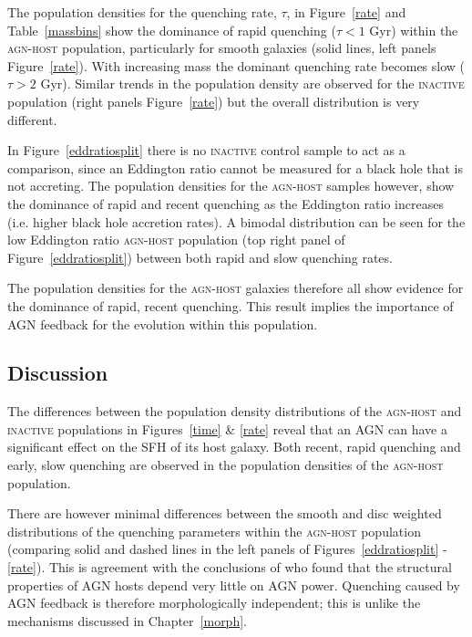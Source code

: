 The population densities for the quenching rate, $\tau$, in Figure~\ref{rate} and Table~\ref{massbins} show the dominance of rapid quenching ($\tau < 1$ Gyr) within the \textsc{agn-host} population, particularly for smooth galaxies (solid lines, left panels Figure~\ref{rate}). With increasing mass the dominant quenching rate becomes slow ($\tau > 2$ Gyr). Similar trends in the population density are observed for the \textsc{inactive} population (right panels Figure~\ref{rate}) but the overall distribution is very different. 

In Figure~\ref{eddratiosplit} there is no \textsc{inactive} control sample to act as a comparison, since an Eddington ratio cannot be measured for a black hole that is not accreting. The population densities for the \textsc{agn-host} samples however, show the dominance of rapid and recent quenching as the Eddington ratio increases (i.e. higher black hole accretion rates). A bimodal distribution can be seen for the low Eddington ratio \textsc{agn-host} population (top right panel of Figure~\ref{eddratiosplit}) between both rapid and slow quenching rates. 

The population densities for the \textsc{agn-host} galaxies therefore all show evidence for the dominance of rapid, recent quenching. This result implies the importance of AGN feedback for the evolution within this population.

\subsection{Discussion}\label{sec:agndis}

The differences between the population density distributions of the \textsc{agn-host} and \textsc{inactive} populations in Figures~\ref{time} \& \ref{rate} reveal that an AGN can have a significant effect on the SFH of its host galaxy. Both recent, rapid quenching and early, slow quenching are observed in the population densities of the \textsc{agn-host} population. 

There are however minimal differences between the smooth and disc weighted distributions of the quenching parameters within the \textsc{agn-host} population (comparing solid and dashed lines in the left panels of Figures~\ref{eddratiosplit} - \ref{rate}). This is agreement with the conclusions of \citet{kauffmann03b} who found that the structural properties of AGN hosts depend very little on AGN power. Quenching caused by AGN feedback is therefore morphologically independent; this is unlike the mechanisms discussed in Chapter~\ref{morph}.

